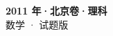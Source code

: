 \documentclass[zihao=-4, a4paper]{ctexart}
\begin{document}
\begin{center}
  {\Large\bfseries 2011 年·北京卷·理科}\\[4pt]
  {\large 数学 · 试题版}
\end{center}
\medskip
{}

\end{document}
